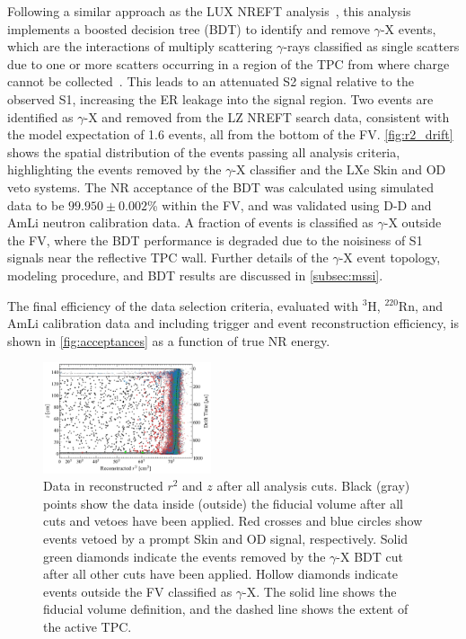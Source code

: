 \documentclass[reprint, showpacs,
preprintnumbers,
amsmath,amssymb,
aps, floatfix,
superscriptaddress,
prd, nofootinbib]{revtex4-1}
\begin{document}
Following a similar approach as the LUX NREFT analysis~\cite{LUX:EFTR4_2021}, this analysis implements a boosted decision tree (BDT) to identify and remove $\gamma$-X events, which are the interactions of multiply scattering $\gamma$-rays classified as single scatters due to one or more scatters occurring in a region of the TPC from where charge cannot be collected~\cite{LUX:EFTR4_2021}.
This leads to an attenuated S2 signal relative to the observed S1, increasing the ER leakage into the signal region.
Two events are identified as $\gamma$-X and removed from the LZ NREFT search data, consistent with the model expectation of 1.6 events, all from the bottom of the FV. 
\autoref{fig:r2_drift} shows the spatial distribution of the events passing all analysis criteria, highlighting the events removed by the $\gamma$-X classifier and the LXe Skin and OD veto systems.
The NR acceptance of the BDT was calculated using simulated data to be $99.950 \pm 0.002$\% within the FV, and was validated using D-D and AmLi neutron calibration data. 
A fraction of events is classified as $\gamma$-X outside the FV, where the BDT performance is degraded due to the noisiness of S1 signals near the reflective TPC wall. 
Further details of the $\gamma$-X event topology, modeling procedure, and BDT results are discussed in \autoref{subsec:mssi}. 
\par
The final efficiency of the data selection criteria, evaluated with ${}^3$H, ${}^{220}$Rn, and AmLi calibration data and including trigger and event reconstruction efficiency, is shown in \autoref{fig:acceptances} as a function of true NR energy.

\begin{figure}[t]
    \centering
    \includegraphics[trim={8 5 5 5},clip, width=0.44\textwidth]{g_paper_rdrift_OD_SKIN}
    \caption{Data in reconstructed $r^2$ and $z$ after all analysis cuts. 
    Black (gray) points show the data inside (outside) the fiducial volume after all cuts and vetoes have been applied.
    Red crosses and blue circles show events vetoed by a prompt Skin and OD signal, respectively.
    Solid green diamonds indicate the events removed by the $\gamma$-X BDT cut after all other cuts have been applied. 
    Hollow diamonds indicate events outside the FV classified as $\gamma$-X.
    The solid line shows the fiducial volume definition, and the dashed line shows the extent of the active TPC.
    }
    \label{fig:r2_drift}
\end{figure}
\end{document}
